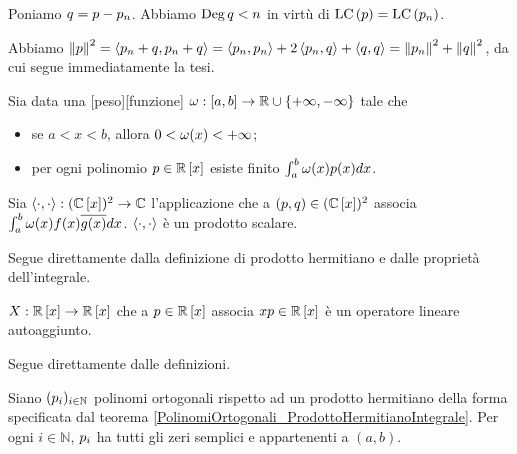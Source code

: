 \Proof Poniamo $q = p - p_n$. Abbiamo $\operatorname{\operatorname{Deg}}{q} < n$ in virt\`u di $\text{LC} \left ( p \right ) = \text{LC} \left ( p_n \right )$.
\par Abbiamo ${\Norm{\Polynomial}}^2 = \HermitianProduct{\OrthogonalPolynomial_n + \VarPolynomial}{\OrthogonalPolynomial_n + \VarPolynomial} = \HermitianProduct{\OrthogonalPolynomial_n}{\OrthogonalPolynomial_n} + 2 \HermitianProduct{\OrthogonalPolynomial_n}{\VarPolynomial} + \HermitianProduct{\VarPolynomial}{\VarPolynomial} = {\Norm{\OrthogonalPolynomial_n}}^2 + {\Norm{\VarPolynomial}}^2$, da cui segue immediatamente la tesi. \EndProof
\begin{Theorem}
	\label{IstituzioniDiAnalisiNumerica_ProdottoHermitianoIntegrale}
	Sia data una [peso][funzione] $\omega: [a,b] \rightarrow \mathbb{R} \cup \lbrace +\infty, -\infty \rbrace$ tale che
	\begin{itemize}
		\item se $a < x < b$, allora  $0 < \omega(x) < + \infty$;
		\item per ogni polinomio $p \in \mathbb{R} \left [ x \right ]$ esiste finito $\int_a^b \omega(x) p(x) dx$.
	\end{itemize}
	Sia $\left \langle \cdot , \cdot \right \rangle: (\mathbb{C} \left [ x \right ])^2 \rightarrow \mathbb{C}$ l'applicazione che a $(p,q) \in (\mathbb{C} \left [ x \right ])^2$ associa $\int_a^b \omega(x) f(x) \overline{g(x)} dx$. $\left \langle \cdot , \cdot \right \rangle$ \`e un prodotto scalare.
\end{Theorem}
\Proof Segue direttamente dalla definizione di prodotto hermitiano e dalle propriet\`a dell'integrale. \EndProof
\begin{Theorem}
	$X: \mathbb{R} \left [ x \right ] \rightarrow \mathbb{R} \left [ x \right ]$ che a $p \in \mathbb{R} \left [ x \right ]$ associa $xp \in \mathbb{R} \left [ x \right ]$ \`e un operatore lineare autoaggiunto.
\end{Theorem}
\Proof Segue direttamente dalle definizioni. \EndProof
\begin{Theorem}
	 Siano $(p_i)_{i \in \mathbb{N}}$ polinomi ortogonali rispetto ad un prodotto hermitiano della forma specificata dal teorema \ref{PolinomiOrtogonali_ProdottoHermitianoIntegrale}. Per ogni $i \in \mathbb{N}$, $p_i$ ha tutti gli zeri semplici e appartenenti a $(a,b)$.
\end{Theorem}
